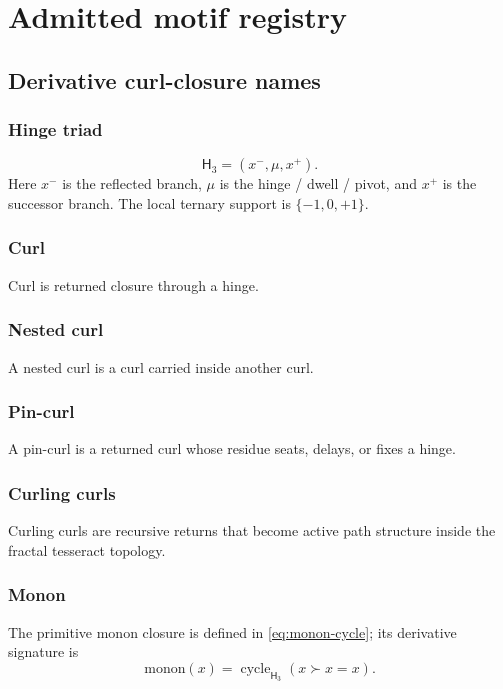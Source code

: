 \section{Admitted motif registry}
\label{app:admitted-motif-registry}
\label{app:curling-curls}

\subsection{Derivative curl-closure names}
\label{app:cc-naming-conventions}

\subsubsection{Hinge triad}
\label{app:cc-hinge-triad}
\[
\mathsf H_3=(x^-,\mu,x^+).
\]
Here \(x^-\) is the reflected branch, \(\mu\) is the hinge / dwell / pivot, and \(x^+\) is the successor branch. The local ternary support is \(\{-1,0,+1\}\).

\subsubsection{Curl}
\label{app:cc-curl}
Curl is returned closure through a hinge.

\subsubsection{Nested curl}
\label{app:cc-nested-curl}
A nested curl is a curl carried inside another curl.

\subsubsection{Pin-curl}
\label{app:cc-pin-curl}
A pin-curl is a returned curl whose residue seats, delays, or fixes a hinge.

\subsubsection{Curling curls}
\label{app:cc-curling-curls}
Curling curls are recursive returns that become active path structure inside the fractal tesseract topology.

\subsubsection{Monon}
\label{app:cc-monon}
The primitive monon closure is defined in \eqref{eq:monon-cycle}; its derivative signature is
\[
\mathrm{monon}(x)=\operatorname{cycle}_{\mathsf H_3}(x\succ x=x).
\]

